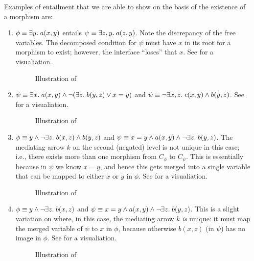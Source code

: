 Examples of entailment that we are able to show on the basis of the existence of a morphism are:
%
\begin{enumerate}
\item{} $\phi\equiv \exists y.\; a(x,y)$ entails $\psi\equiv \exists z,y.\; a(z,y)$. Note the discrepancy of the free variables. The decomposed condition for $\psi$ must have $x$ in its root for a morphism to exist; however, the interface ``loses'' that $x$. See  for a visualiation.

  \begin{figure}
    \centering
    
    \caption{Illustration of }
  \end{figure}
  
\item{} $\psi\equiv \exists x.\; a(x,y) \wedge \neg (\exists z.\; b(y,z) \vee x=y)$ and $\psi\equiv \neg \exists x,z.\; c(x,y)\wedge b(y,z)$. See  for a visualiation.
  
  \begin{figure}
    \centering
    
    \caption{Illustration of }
  \end{figure}

\item{} $\phi\equiv y\wedge \neg\exists z.\; b(x,z)\wedge b(y,z)$ and $\psi\equiv x=y\wedge a(x,y)\wedge \neg \exists z.\; b(y,z)$. The mediating arrow $k$ on the second (negated) level is not unique in this case; i.e., there exists more than one morphism from $C_\phi$ to $C_\psi$. This is essentially because in $\psi$ we know $x=y$, and hence this gets merged into a single variable that can be mapped to either $x$ or $y$ in $\phi$. See  for a visualiation.
  
  \begin{figure}
    \centering
    
    \caption{Illustration of }
  \end{figure}
  
\item{} $\phi\equiv y\wedge \neg\exists z.\; b(x,z)$ and $\psi\equiv x=y\wedge a(x,y)\wedge \neg \exists z.\; b(y,z)$. This is a slight variation on  where, in this case, the mediating arrow $k$ \emph{is} unique: it must map the merged variable of $\psi$ to $x$ in $\phi$, because otherwise $b(x,z)$ (in $\psi$) has no image in $\phi$. See  for a visualiation.
  
  \begin{figure}
    \centering
    
    \caption{Illustration of }
  \end{figure}
\end{enumerate}
